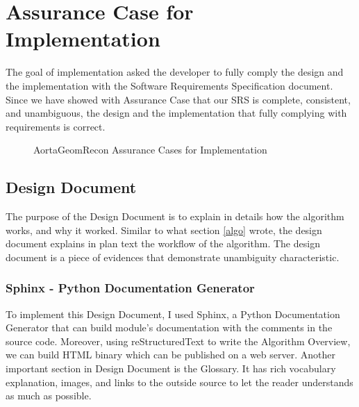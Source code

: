 \section{Assurance Case for Implementation}
The goal of implementation asked the developer to fully comply the design and the implementation with the Software Requirements Specification document. Since we have showed with Assurance Case that our SRS is complete, consistent, and unambiguous, the design and the implementation that fully complying with requirements is correct.

\begin{figure}[H]
    \centering
    \caption[AortaGeomRecon Assurance Cases for Implementation]{AortaGeomRecon Assurance Cases for Implementation}
    \label{fig_agr_ac_gi}
\end{figure}

\subsection{Design Document}
The purpose of the Design Document \cite{DD} is to explain in details how the algorithm works, and why it worked. Similar to what section \ref{algo} wrote, the design document explains in plan text the workflow of the algorithm. The design document is a piece of evidences that demonstrate unambiguity characteristic.

\subsubsection{Sphinx - Python Documentation Generator}
To implement this Design Document, I used Sphinx, a Python Documentation Generator that can build module's documentation with the comments in the source code. Moreover, using reStructuredText to write the Algorithm Overview, we can build HTML binary which can be published on a web server. Another important section in Design Document is the Glossary. It has rich vocabulary explanation, images, and links to the outside source to let the reader understands as much as possible.


